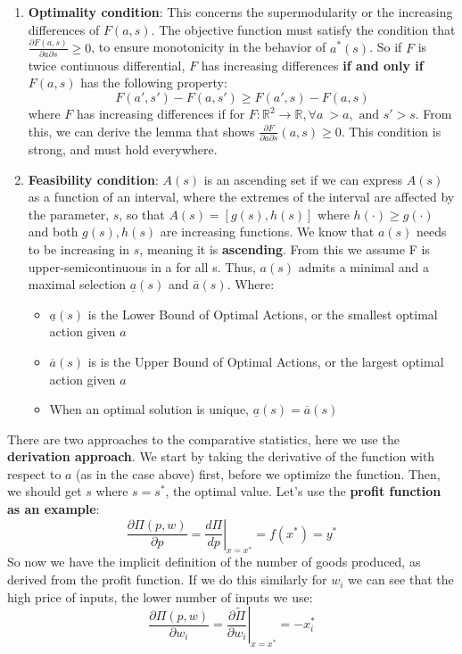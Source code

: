 \documentclass{article}
\begin{document}
\begin{enumerate}   
    \item \textbf{Optimality condition}:\label{inc_diff} This concerns the supermodularity or the increasing differences of $F(a,s)$. The objective function must satisfy the condition that $\frac{\partial F(a,s)}{\partial a \partial s} \geq 0$, to ensure monotonicity in the behavior of $a^*(s)$.
    So if $F$ is twice continuous differential, $F$ has increasing differences \textbf{if and only if} $F(a,s)$ has the following property: \[
    F(a', s') - F(a,s') \geq F(a', s) - F(a,s)
    \]
    where $F$ has increasing differences if for $F: \mathbb{R}^{2} \rightarrow \mathbb{R}, \forall a\ > a, \text{ and } s' > s$. From this, we can derive the lemma that shows $\frac{\partial F}{\partial a \partial s }(a,s) \geq 0 $. This condition is strong, and must hold everywhere. 
    
    \item \textbf{Feasibility condition}:\label{feas} $A(s)$ is an ascending set if we can express $A(s)$ as a function of an interval, where the extremes of the interval are affected by the parameter, $s$, so that $A(s) = [g(s), h(s)]$ where $h(\cdot) \geq g(\cdot)$ and both $g(s), h(s)$ are increasing functions. We know that $a(s)$ needs to be increasing in $s$, meaning it is \textbf{ascending}. From this we assume F is upper-semicontinuous in a for all s. Thus, $a(s)$ admits a minimal and a maximal selection $\underline{a}(s)$ and $\overline{a}(s)$. Where:
    \begin{itemize}
        \item $\underline{a}(s)$ is the Lower Bound of Optimal Actions, or the smallest optimal action given $a$
        \item $\overline{a}(s)$ is is the Upper Bound of Optimal Actions, or the largest optimal action given $a$
        \item When an optimal solution is unique, $\underline{a}(s) = \overline{a}(s)$
    \end{itemize}
    
\end{enumerate}
\vspace{.5cm}

\noindent There are two approaches to the comparative statistics, here we use the \textbf{derivation approach}. We start by taking the derivative of the function with respect to $a$ (as in the case above) first, before we optimize the function. Then, we should get $s$ where $s = s^*$, the optimal value. Let's use the \textbf{profit function as an example}: 
\[
\left. \frac{\partial \Pi(p,w)}{\partial p} = \frac{d \Pi}{dp} \right|_{x=x^*} = f(x^*) = y^*
\]
So now we have the implicit definition of the number of goods produced, as derived from the profit function. If we do this similarly for $w_i$ we can see that the high price of inputs, the lower number of inputs we use: 
\[
\left. \frac{\partial \Pi(p,w)}{\partial w_i} = \frac{\partial \tilde{\Pi}}{\partial w_i} \right|_{x=x^*} = -x_i^*
\]
\end{document}
